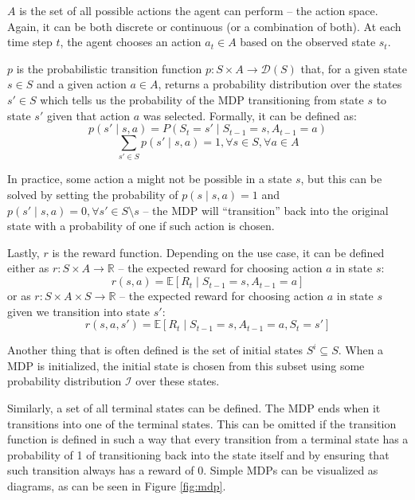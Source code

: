 \documentclass[
  digital,     %
  oneside,     %
  nosansbold,  %
  nocolorbold, %
  lof,         %
  lot,         %
]{fithesis4}
\begin{document}
$A$ is the set of all possible actions the agent can perform -- the action space. Again, it can be both discrete or continuous (or a combination of both). At each time step $t$, the agent chooses an action $a_t\in A$ based on the observed state $s_t$.

$p$ is the probabilistic transition function $p\colon S \times A \to \mathcal{D}(S)$ that, for a given state $s\in S$ and a given action $a\in A$, returns a probability distribution over the states $s'\in S$ which tells us the probability of the MDP transitioning from state $s$ to state $s'$ given that action $a$ was selected. Formally, it can be defined as:
\begin{equation}
p(s' \mid s,a)=P(S_t=s'\mid S_{t-1}=s,A_{t-1}=a)    
\end{equation}
\begin{equation}
\sum_{s'\in S} p(s'\mid s,a)=1, \forall s \in S, \forall a \in A
\end{equation}

In practice, some action a might not be possible in a state $s$, but this can be solved by setting the probability of $p(s\mid s, a) = 1$ and $p(s' \mid  s, a) = 0, \forall s'\in S \setminus s$ -- the MDP will \enquote{transition} back into the original state with a probability of one if such action is chosen.

Lastly, $r$ is the reward function. Depending on the use case, it can be defined either as $r\colon S \times A \to \mathbb{R}$ \cite{PA230} -- the expected reward for choosing action $a$ in state $s$:
\begin{equation}
r(s,a)= \mathbb{E} [R_t\mid S_{t-1}=s, A_{t-1}=a]
\end{equation}
or as $r\colon S\times A \times S \to \mathbb{R}$ -- the expected reward for choosing action $a$ in state $s$ given we transition into state $s'$:
\begin{equation}
r(s, a, s')= \mathbb{E} [R_t\mid S_{t-1}=s, A_{t-1}=a, S_t=s']
\end{equation}

Another thing that is often defined is the set of initial states $S^i \subseteq S$. When a MDP is initialized, the initial state is chosen from this subset using some probability distribution $\mathcal{I}$ over these states.

Similarly, a set of all terminal states can be defined. The MDP ends when it transitions into one of the terminal states. This can be omitted if the transition function is defined in such a way that every transition from a terminal state has a probability of 1 of transitioning back into the state itself and by ensuring that such transition always has a reward of 0.
Simple MDPs can be visualized as diagrams, as can be seen in Figure \ref{fig:mdp}.
\end{document}
